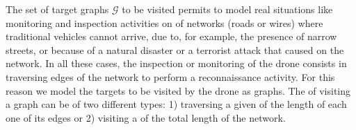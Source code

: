 \noindent
The set of target graphs $\mathcal G$ to be visited permits to model real situations like monitoring and inspection activities on  of networks (roads or wires) where traditional vehicles cannot arrive, due to, for example, the presence of narrow streets, or because of a natural disaster or a terrorist attack that caused  on the network. In all these cases, the inspection or monitoring of the drone consists in traversing edges of the network to perform a reconnaissance activity. For this reason\RE{,} we model the targets to be visited by the drone as graphs. The  of visiting a graph can be of two different types: 1) traversing a given  of the length of each one of its edges or 2) visiting a  of the total length of the network. 


